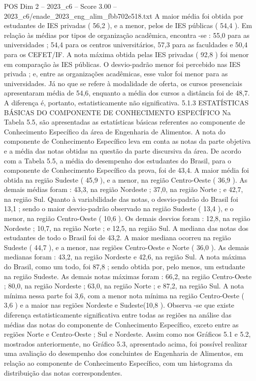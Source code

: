 \begin{textsample}{POS Dim 2 – 2023\_c6 – Score 3.00 – 2023\_c6/enade\_2023\_eng\_alim\_fbb702e518.txt}
A maior média foi obtida por estudantes de IES privadas ( 56,2 ), e a menor, pelos de IES públicas ( 54,4 ).
Em relação às médias por tipos de organização acadêmica, encontra -se : 55,0 para as universidades ; 54,4 para os centros universitários, 57,3 para as faculdades e 50,4 para os CEFET/IF.
A nota máxima obtida pelas IES privadas ( 92,8 ) foi menor em comparação às IES públicas.
O desvio-padrão menor foi percebido nas IES privada ; e, entre as organizações acadêmicas, esse valor foi menor para as universidades.
Já no que se refere à modalidade de oferta, os cursos presenciais apresentaram média de 54,6, enquanto a média dos cursos a distância foi de 48,7.
A diferença é, portanto, estatisticamente não significativa. 5.1.3 ESTATÍSTICAS BÁSICAS DO COMPONENTE DE CONHECIMENTO ESPECÍFICO Na Tabela 5.5, são apresentadas as estatísticas básicas referentes ao componente de Conhecimento Específico da área de Engenharia de Alimentos.
A nota do componente de Conhecimento Específico leva em conta as notas da parte objetiva e a média das notas obtidas na questão da parte discursiva da área.
De acordo com a Tabela 5.5, a média do desempenho dos estudantes do Brasil, para o componente de Conhecimento Específico da prova, foi de 43,4.
A maior média foi obtida na região Sudeste ( 45,9 ), e a menor, na região Centro-Oeste ( 36,9 ).
As demais médias foram : 43,3, na região Nordeste ; 37,0, na região Norte ; e 42,7, na região Sul.
Quanto à variabilidade das notas, o desvio-padrão do Brasil foi 13,1 ; sendo o maior desvio-padrão observado na região Sudeste ( 13,4 ), e o menor, na região Centro-Oeste ( 10,6 ).
Os demais desvios foram : 12,8, na região Nordeste ; 10,7, na região Norte ; e 12,5, na região Sul.
A mediana das notas dos estudantes de todo o Brasil foi de 43,2.
A maior mediana ocorreu na região Sudeste ( 44,7 ), e a menor, nas regiões Centro-Oeste e Norte ( 36,0 ).
As demais medianas foram : 43,2, na região Nordeste e 42,6, na região Sul.
A nota máxima do Brasil, como um todo, foi 87,8 ; sendo obtida por, pelo menos, um estudante na região Sudeste.
As demais notas máximas foram : 66,2, na região Centro-Oeste ; 80,0, na região Nordeste ; 63,0, na região Norte ; e 87,2, na região Sul.
A nota mínima nessa parte foi 3,6, com a menor nota mínima na região Centro-Oeste ( 3,6 ) e a maior nas regiões Nordeste e Sudeste(10,8 ).
Observa -se que existe diferença estatisticamente significativa entre todas as regiões na análise das médias das notas do componente de Conhecimento Específico, exceto entre as regiões Norte e Centro-Oeste ; Sul e Nordeste.
Assim como nos Gráficos 5.1 e 5.2, mostrados anteriormente, no Gráfico 5.3, apresentado acima, foi possível realizar uma avaliação do desempenho dos concluintes de Engenharia de Alimentos, em relação ao componente de Conhecimento Específico, com um histograma da distribuição das notas correspondentes.

\end{textsample}
